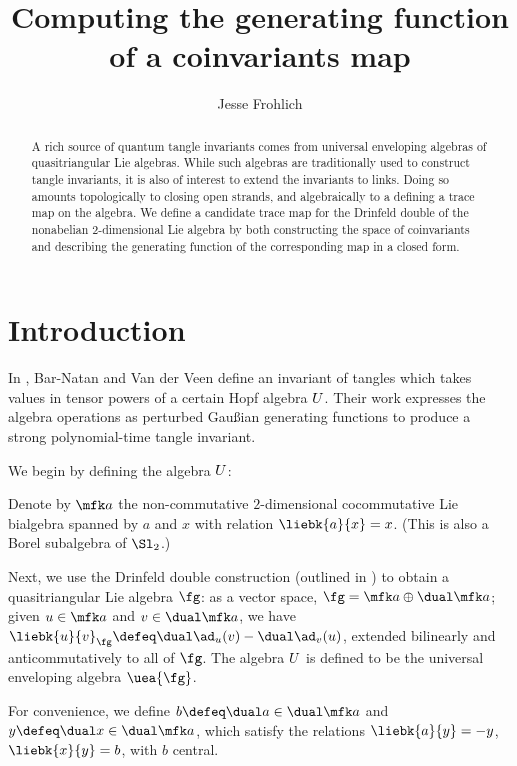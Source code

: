\documentclass{article}
\title{Computing the generating function of a coinvariants map}
\author{Jesse Frohlich}
\begin{document}
\maketitle

\begin{abstract}
        A rich source of quantum tangle invariants comes from universal
        enveloping algebras of quasitriangular Lie algebras. While such
        algebras are traditionally used to construct tangle invariants, it is
        also of interest to extend the invariants to links. Doing so amounts
        topologically to closing open strands, and algebraically to a defining a
        trace map on the algebra. We define a candidate trace map for the
        Drinfeld double of the nonabelian 2-dimensional Lie algebra by both
        constructing the space of coinvariants and describing the generating
        function of the corresponding map in a closed form.
\end{abstract}

\section{Introduction}

In \cite{BV}, Bar-Natan and Van der Veen define an invariant of tangles which
takes values in tensor powers of a certain Hopf algebra $U$. Their work
expresses the algebra operations as perturbed Gaußian generating functions to
produce a strong polynomial-time tangle invariant.

We begin by defining the algebra $U$:
\begin{definition}
        Denote by $\fa$ the non-commutative $2$-dimensional cocommutative Lie
        bialgebra spanned by $a$ and $x$ with relation $\liebk{a}{x} = x$.
        (This is also a Borel subalgebra of $\Sl_2$.)
\end{definition}
Next, we use the Drinfeld double construction (outlined in \cite{ES}) to obtain
a quasitriangular Lie algebra $\fg$: as a vector space,
$\fg = \fa \oplus \dual\fa$; given $u \in \fa$ and $v\in \dual \fa$, we have
$\liebk{u}{v}_{\fg} \defeq \dual\ad_u(v) - \dual\ad_v(u)$, extended bilinearly
and anticommutatively to all of $\fg$.
The algebra $U$ is defined to be the universal enveloping algebra
$\uea{\fg}$.

For convenience, we define $b \defeq \dual a \in \dual\fa$ and $y \defeq \dual x
\in \dual\fa$, which satisfy the relations $\liebk{a}{y}=-y$, $\liebk{x}{y}=b$,
with $b$ central.
\end{document}
